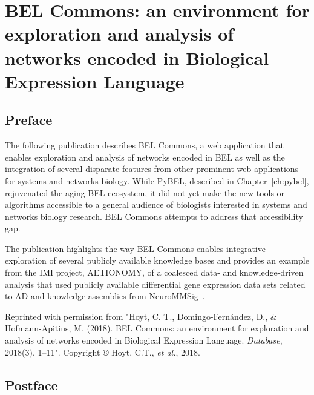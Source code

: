 \chapter{BEL Commons: an environment for exploration and analysis of networks encoded in Biological Expression Language}\label{ch:belcommons}

\section*{Preface}

The following publication describes BEL Commons, a web application that enables exploration and analysis of networks encoded in \ac{BEL} as well as the integration of several disparate features from other prominent web applications for systems and networks biology.
While PyBEL, described in Chapter~\ref{ch:pybel}, rejuvenated the aging \ac{BEL} ecosystem, it did not yet make the new tools or algorithms accessible to a general audience of biologists interested in systems and networks biology research.
BEL Commons attempts to address that accessibility gap.

The publication highlights the way BEL Commons enables integrative exploration of several publicly available knowledge bases and provides an example from the \ac{IMI} project, AETIONOMY, of a coalesced data- and knowledge-driven analysis that used publicly available differential gene expression data sets related to \ac{AD} and knowledge assemblies from NeuroMMSig~\cite{Domingo-Fernandez2017}.

\vspace*{\fill}

Reprinted with permission from "Hoyt, C. T., Domingo-Fern\'{a}ndez, D., \& Hofmann-Apitius, M. (2018). BEL Commons: an environment for exploration and analysis of networks encoded in Biological Expression Language. \textit{Database}, 2018(3), 1–11".
Copyright © Hoyt, C.T., \textit{et al.}, 2018.



\section*{Postface}

